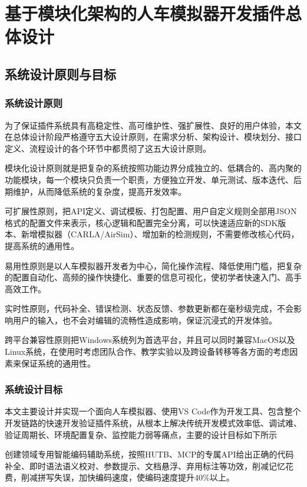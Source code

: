 
\chapter{基于模块化架构的人车模拟器开发插件总体设计}

\section{系统设计原则与目标}

\subsection{系统设计原则}

为了保证插件系统具有高稳定性、高可维护性、强扩展性、良好的用户体验，本文在总体设计阶段严格遵守五大设计原则，在需求分析、架构设计、模块划分、接口定义、流程设计的各个环节中都贯彻了这五大设计原则。

模块化设计原则就是把复杂的系统按照功能边界分成独立的、低耦合的、高内聚的功能模块，每一个模块只负责一个职责，方便独立开发、单元测试、版本迭代、后期维护，从而降低系统的复杂度，提高开发效率。

可扩展性原则，把API定义、调试模板、打包配置、用户自定义规则全部用JSON格式的配置文件来表示，核心逻辑和配置完全分离，可以快速适应新的SDK版本、新增模拟器（CARLA/AirSim）、增加新的检测规则，不需要修改核心代码，提高系统的通用性。

易用性原则是以人车模拟器开发者为中心，简化操作流程、降低使用门槛，把复杂的配置自动化、高频的操作快捷化、重要的信息可视化，使初学者快速入门、高手高效工作。

实时性原则，代码补全、错误检测、状态反馈、参数更新都在毫秒级完成，不会影响用户的输入，也不会对编辑的流畅性造成影响，保证沉浸式的开发体验。

跨平台兼容性原则把Windows系统列为首选平台，并且可以同时兼容MacOS以及Linux系统，在使用时考虑团队合作、教学实验以及跨设备转移等各方面的考虑因素来保证系统的通用性。

\subsection{系统设计目标}

本文主要设计并实现一个面向人车模拟器、使用VS
Code作为开发工具、包含整个开发链路的快速开发验证插件系统，从根本上解决传统开发模式效率低、调试难、验证周期长、环境配置复杂、监控能力弱等痛点，主要的设计目标如下所示

创建领域专用智能编码辅助系统，按照HUTB、MCP的专属API给出正确的代码补全、即时语法语义校对、参数提示、文档悬浮、弃用标注等功效，削减记忆花费，削减拼写失误，加快编码速度，使编码速度提升40\%以上。

